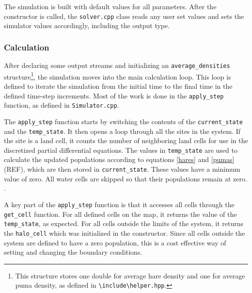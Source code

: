\documentclass[a4paper,11pt]{article}
\begin{document}
The simulation is built with default values for all parameters.  After the constructor is called, the \texttt{solver.cpp} class reads any user set values and sets the simulator values accordingly, including the output type.

\subsubsection{Calculation}

After declaring some output streams and initializing an \texttt{average\_densities} structure\footnote{This structure stores one double for average hare density and one for average puma density, as defined in \texttt{\textbackslash include\textbackslash helper.hpp}.}, the simulation moves into the main calculation loop.  This loop is defined to iterate the simulation from the initial time to the final time in the defined time-step increments.  Most of the work is done in the \texttt{apply\_step} function, as defined in \texttt{Simulator.cpp}.  

The  \texttt{apply\_step} function starts by switching the contents of the  \texttt{current\_state} and the \texttt{temp\_state}.  It then opens a loop through all the sites in the system.  If the site is a land cell, it counts the number of neighboring land cells for use in the discretized partial differential equations.  The values in \texttt{temp\_state} are used to calculate the updated populations according to equations \eqref{hares} and \eqref{pumas} (REF), which are then stored in \texttt{current\_state}.  These values have a minimum value of zero.  All water cells are skipped so that their populations remain at zero.
.  

A key part of the \texttt{apply\_step} function is that it accesses all cells through the \texttt{get\_cell} function.  For all defined cells on the map, it returns the value of the \texttt{temp\_state}, as expected.  For all cells outside the limits of the system, it returns the \texttt{halo\_cell} which was initialized in the constructor.  Since all cells outside the system are defined to have a zero population, this is a cost effective way of setting and changing the boundary conditions.

\end{document}
